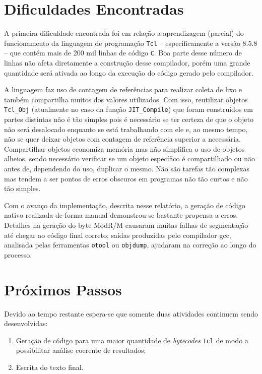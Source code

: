 \section{Dificuldades Encontradas}

A primeira dificuldade encontrada foi em relação a aprendizagem
(parcial) do funcionamento da linguagem de programação \texttt{Tcl} --
especificamente a versão 8.5.8 --
que contém mais de 200 mil linhas de código \texttt{C}. Boa parte
desse número de linhas não afeta diretamente a construção desse
compilador, porém uma grande quantidade será ativada
ao longo da execução do código gerado pelo compilador.

A linguagem faz uso de contagem de referências para realizar coleta de
lixo e também compartilha muitos dos valores utilizados. Com isso,
reutilizar objetos \verb!Tcl_Obj! (atualmente no caso da função
\verb!JIT_Compile!) que foram construídos em partes distintas não é tão
simples pois é necessário se ter certeza de que o objeto não será
desalocado enquanto se está trabalhando com ele e, ao mesmo tempo, não
se quer deixar objetos com contagem de referência superior a
necessária. Compartilhar objetos economiza memória mas não simplifica
o uso de objetos alheios, sendo necessário verificar se um objeto
específico é compartilhado ou não antes de, dependendo do uso,
duplicar o mesmo. Não são tarefas tão complexas mas tendem a ser
pontos de erros obscuros em programas não tão curtos e não tão simples.

Com o avanço da implementação, descrita nesse relatório, a geração de
código nativo realizada de forma manual demonstrou-se bastante
propensa a erros. Detalhes na geração do byte ModR/M causaram muitas
falhas de segmentação até chegar ao código final correto; saídas
produzidas pelo compilador gcc, analisada pelas ferramentas \verb!otool! ou
\verb!objdump!, ajudaram na correção ao longo do processo.

\section{Próximos Passos}

Devido ao tempo restante espera-se que somente duas atividades
continuem sendo desenvolvidas:
\begin{enumerate}
\item Geração de código para uma maior quantidade de \textit{bytecodes}
  \texttt{Tcl} de modo a possibilitar análise coerente de resultados;
\item Escrita do texto final.
\end{enumerate}

